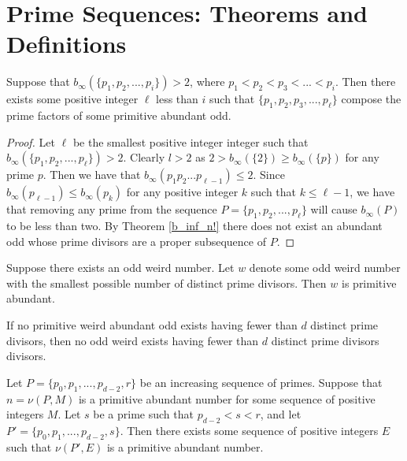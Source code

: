 \documentclass[../paper.tex]{subfiles}
\begin{document}
\section{Prime Sequences: Theorems and Definitions}

\begin{theorem} \label{Primechops}
Suppose that $b_{\infty}(\{p_1,p_2, ..., p_i\}) > 2$,
where $p_1 < p_2 < p_3 < ... < p_i$. Then there exists some
positive integer $\ell$ less than $i$ such that $\{p_1, p_2, p_3, 
..., p_\ell\}$ compose the prime factors of some primitive 
abundant odd.
\end{theorem}

\begin{proof}
Let $\ell$ be the smallest positive integer integer such that 
$b_{\infty}(\{p_1, p_2, ..., p_\ell\}) > 2$. Clearly $l > 2$ as 
$2 > b_{\infty}(\{2\}) \geq b_{\infty}(\{p\})$ for any prime $p$.
Then we have that 
$b_{\infty}(p_1 p_2 ... p_{\ell - 1}) \leq 2$. Since 
$b_{\infty}(p_{\ell - 1}) \leq b_{\infty}(p_{k})$ for any
positive integer $k$ such that  $k \leq \ell - 1$, we have that
removing any prime from the sequence $P = \{p_1, p_2, ..., p_{\ell} \}$ will
cause $b_{\infty}(P)$ to be less than two. By Theorem
{\ref{b_inf_n!}} there does not exist
an abundant odd whose prime divisors are a proper subsequence of
$P$.
\end{proof}

\begin{theorem} Suppose there exists an odd weird number. Let $w$
denote some odd weird number with the smallest possible number of
distinct prime divisors. Then $w$ is primitive abundant.
\end{theorem}

\begin{coro} If no primitive weird abundant odd exists
having fewer than $d$ distinct prime divisors, then no odd weird
exists having fewer than $d$ distinct prime divisors divisors.
\end{coro}


\begin{theorem}\label{Continuity}
Let $P = \{p_0, p_1, ..., p_{d-2}, r\}$ be an increasing sequence 
of primes. Suppose that $n = \nu(P, M)$ is a primitive abundant 
number for some sequence of positive integers $M$. Let $s$ be a 
prime such that $p_{d-2} < s < r$, and let $P' = \{p_0, p_1,...,
p_{d-2}, s\}$. Then there exists some sequence of positive integers
$E$ such that $\nu(P', E)$ is a primitive abundant number.
\end{theorem}
\end{document}
